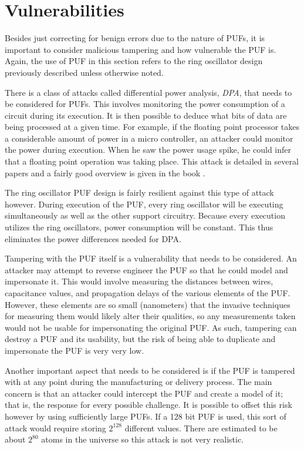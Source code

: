 \section{Vulnerabilities}
Besides just correcting for benign errors due to the nature of PUFs, it is important to consider
malicious tampering and how vulnerable the PUF is. Again, the use of PUF in this section refers
to the ring oscillator design previously described unless otherwise noted.

There is a class of attacks called differential power analysis, \textit{DPA}, that needs to be considered
for PUFs. This involves monitoring the power consumption of a circuit during its execution. It is then possible
to deduce what bits of data are being processed at a given time. For example, if the floating point processor
takes a considerable amount of power in a micro controller, an attacker could monitor the power during execution.
When he saw the power usage spike, he could infer that a floating point operation was taking place. This attack
is detailed in several papers and a fairly good overview is given in the book \cite{securityengineering}.

The ring oscillator PUF design is fairly resilient against this type of attack however. During execution of the
PUF, every ring oscillator will be executing simultaneously as well as the other support circuitry. Because
every execution utilizes the ring oscillators, power consumption will be constant. This thus eliminates the
power differences needed for DPA.

Tampering with the PUF itself is a vulnerability that needs to be considered. An attacker may attempt
to reverse engineer the PUF so that he could model and impersonate it. This would involve measuring
the distances between wires, capacitance values, and propagation delays of the various elements of the PUF.
However, these elements are so small (nanometers) that the invasive techniques for measuring them
would likely alter their qualities, so any measurements taken would not be usable for impersonating
the original PUF. As such, tampering can destroy a PUF and its usability, but the risk of being able
to duplicate and impersonate the PUF is very very low.

Another important aspect that needs to be considered is if the PUF is tampered with at any point
during the manufacturing or delivery process. The main concern is that an attacker could intercept
the PUF and create a model of it; that is, the response for every possible challenge. It is possible to
offset this risk however by using sufficiently large PUFs. If a 128 bit PUF is used, this sort of attack
would require storing $2^{128}$ different values. There are estimated to be about $2^{80}$ atoms
in the universe so this attack is not very realistic.

